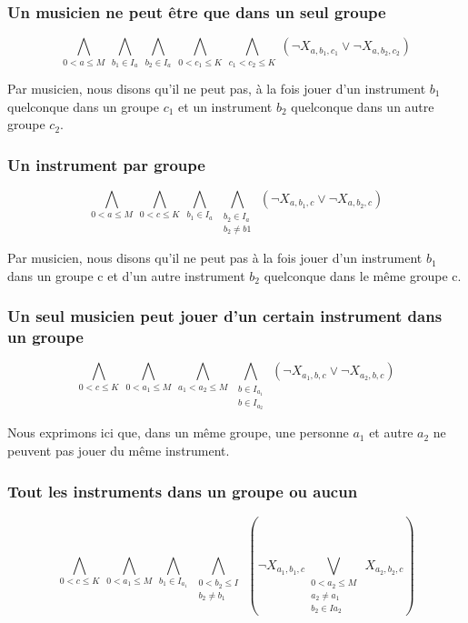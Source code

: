 \documentclass[11pt]{article}
\begin{document}
\subsubsection{Un musicien ne peut être que dans un seul groupe}

$$\bigwedge\limits_{0<a\le M}\ \bigwedge\limits_{b_1\in I_a}\ \bigwedge\limits_{b_2\in I_a}\ \bigwedge\limits_{0<c_1\le K}\ \bigwedge\limits_{c_1<c_2\le K}\ \left(\neg X_{a,b_1,c_1} \vee \neg X_{a,b_2,c_2}\right)$$

Par musicien, nous disons qu'il ne peut pas, à la fois jouer d'un instrument $b_1$ quelconque dans un groupe $c_1$ et un instrument $b_2$ quelconque dans un autre groupe $c_2$.

\subsubsection{Un instrument par groupe}

$$\bigwedge\limits_{0<a\le M}\ \bigwedge\limits_{0<c\le K}\ \bigwedge\limits_{b_1\in I_a}\ \bigwedge\limits_{\substack{b_2\in I_a \\ b_2 \ne b1}}\ \left(\neg X_{a,b_1,c} \vee \neg X_{a,b_2,c}\right)$$

Par musicien, nous disons qu'il ne peut pas à la fois jouer d'un instrument $b_1$ dans un groupe c et d'un autre instrument $b_2$ quelconque dans le même groupe c.

\subsubsection{Un seul musicien peut jouer d'un certain instrument dans un groupe}

$$\bigwedge\limits_{0<c\le K}\ \bigwedge\limits_{0<a_1\le M}\ \bigwedge\limits_{a_1<a_2\le M}\ \bigwedge\limits_{\substack{b\in I_{a_1} \\ b\in I_{a_2}}}\ \left(\neg X_{a_1,b,c} \vee \neg X_{a_2,b,c}\right)$$

Nous exprimons ici que, dans un même groupe, une personne $a_1$ et autre $a_2$ ne peuvent pas jouer du même instrument.

\subsubsection{Tout les instruments dans un groupe ou aucun}

$$\bigwedge\limits_{0<c\le K}\ \bigwedge\limits_{0<a_1\le M}\ \bigwedge\limits_{b_1\in I_{a_1}}\ \bigwedge\limits_{\substack{0<b_2\le I \\ b_2 \ne b_1}}\ \left(\neg X_{a_1,b_1,c} \bigvee\limits_{\substack{0<a_2\le M \\ a_2 \ne a_1 \\ b_2 \in I{a_2}}}\ X_{a_2,b_2,c}\right)$$
\end{document}
